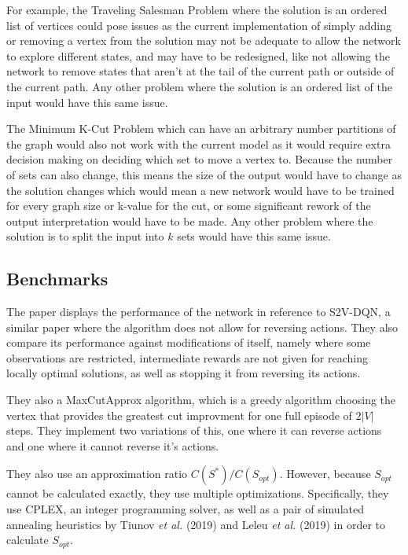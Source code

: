 \documentclass{article}
\begin{document}
For example, the Traveling Salesman Problem where the solution is an ordered list of vertices could pose issues as the current implementation of simply adding or removing a vertex from the solution may not be adequate to allow the network to explore different states, and may have to be redesigned, like not allowing the network to remove states that aren't at the tail of the current path or outside of the current path. Any other problem where the solution is an ordered list of the input would have this same issue.

The Minimum K-Cut Problem which can have an arbitrary number partitions of the graph would also not work with the current model as it would require extra decision making on deciding which set to move a vertex to. Because the number of sets can also change, this means the size of the output would have to change as the solution changes which would mean a new network would have to be trained for every graph size or k-value for the cut, or some significant rework of the output interpretation would have to be made. Any other problem where the solution is to split the input into $k$ sets would have this same issue.

\subsection{Benchmarks}

The paper displays the performance of the network in reference to S2V-DQN, a similar paper where the algorithm does not allow for reversing actions. They also compare its performance against modifications of itself, namely where some observations are restricted, intermediate rewards are not given for reaching locally optimal solutions, as well as stopping it from reversing its actions. 

They also a MaxCutApprox algorithm, which is a greedy algorithm choosing the vertex that provides the greatest cut improvment for one full episode of $2|V|$ steps. They implement two variations of this, one where it can reverse actions and one where it cannot reverse it's actions. 

They also use an approximation ratio $C(S^*)/C(S_{opt})$. However, because $S_{opt}$ cannot be calculated exactly, they use multiple optimizations. Specifically, they use CPLEX, an integer programming solver, as well as a pair of simulated annealing heuristics by Tiunov \textit{et al.} (2019) and Leleu \textit{et al.} (2019) in order to calculate $S_{opt}$. 
\end{document}
